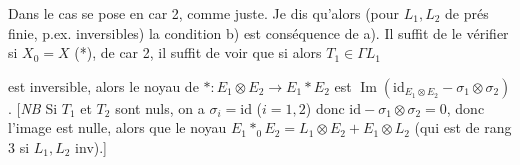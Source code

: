 \documentclass[11pt,a4paper]{article}
\begin{document}
Dans le cas   se pose en car 2, comme \ill{} juste. Je dis qu'alors (pour $L_1, L_2$ de prés finie, p.ex. inversibles) la condition b) est conséquence de a). Il suffit de \struck{\ill{}} le vérifier \struck{\ill{}} si $X_0 = X$ (*), de car 2, il suffit de voir que si alors $T_1 \in \Gamma L_1$

est inversible, alors le noyau de $* : E_1 \otimes E_2 \to E_1 * E_2$ est $\operatorname{Im}(\mathrm{id}_{E_1 \otimes E_2} - \sigma_1 \otimes \sigma_2)$. [\emph{NB} Si $T_1$ et $T_2$ sont nuls, on a $\sigma_i = \mathrm{id}$ ($i = 1,2$) donc $\mathrm{id} - \sigma_1 \otimes \sigma_2 = 0$, donc l'image est nulle, alors que le noyau  \struck{\ill{}}  $E_1 *_0 E_2 = L_1 \otimes E_2 + E_1 \otimes L_2$ (qui est de rang 3 si $L_1, L_2$ inv).]
\end{document}
